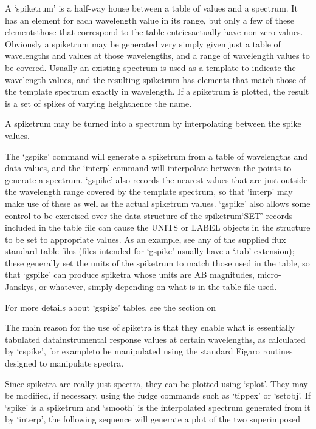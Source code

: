    A `spiketrum' is a half-way house between a table of values and a
   spectrum.  It has an element for each wavelength value in its range,
   but only a few of these elements\latorhtm{---}{-}those that correspond to
   the table entries\latorhtm{---}{-}actually have non-zero values.
   Obviously a spiketrum may
   be generated very simply given just a table of wavelengths and values
   at those wavelengths, and a range of wavelength values to be covered.
   Usually an existing spectrum is used as a template to indicate the
   wavelength values, and the resulting spiketrum has elements that
   match those of the template spectrum exactly in wavelength.  If a
   spiketrum is plotted, the result is a set of spikes of varying
   height\latorhtm{---}{-}hence the name.

   A spiketrum may be turned into a spectrum by interpolating between
   the spike values.

   The `gspike' command will generate a spiketrum from a table of
   wavelengths and data values, and the `interp' command will
   interpolate between the points to generate a spectrum.  `gspike' also
   records the nearest values that are just outside the wavelength range
   covered by the template spectrum, so that `interp' may make use of
   these as well as the actual spiketrum values. `gspike' also allows
   some control to be exercised over the data structure of the
   spiketrum\latorhtm{---}{-}`SET' records included in the table file
   can cause the UNITS or
   LABEL objects in the structure to be set to appropriate values. As an
   example, see any of the supplied flux standard table files (files
   intended for `gspike' usually have a `.tab' extension); these
   generally set the units of the spiketrum to match those used in the
   table, so that `gspike' can produce spiketra whose units are AB
   magnitudes, micro-Janskys, or whatever, simply depending on what is
   in the table file used.

   For more details about `gspike' tables, see
   {the section on }

   The main reason for the use of spiketra is that they enable what is
   essentially tabulated data\latorhtm{---}{-}instrumental response values at
   certain wavelengths, as calculated by `cspike', for
   example\latorhtm{---}{-}to be
   manipulated using the standard Figaro routines designed to manipulate
   spectra.

   Since spiketra are really just spectra, they can be plotted using
   `splot'.  They may be modified, if necessary, using the fudge
   commands such as `tippex' or `setobj'.  If `spike' is a spiketrum and
   `smooth' is the interpolated spectrum generated from it by `interp',
   the following sequence will generate a plot of the two
   superimposed\latorhtm{---}{-}

